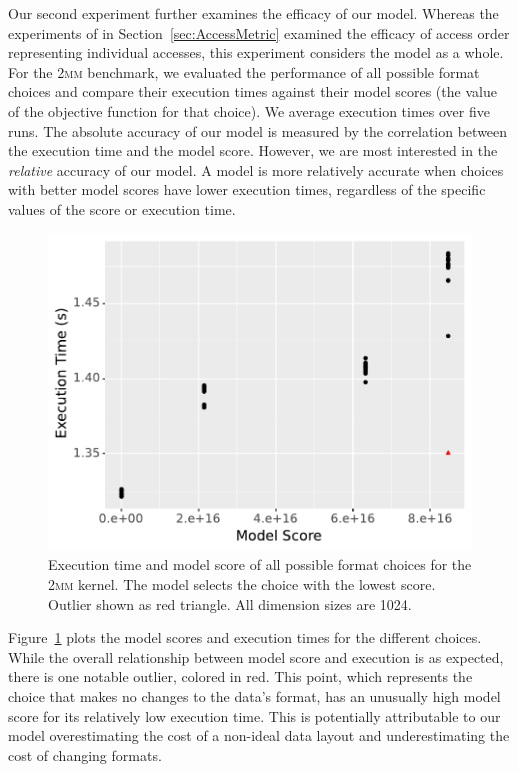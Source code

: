 \documentclass[sigconf,review=true]{acmart}
\begin{document}
Our second experiment further examines the efficacy of our model. 
Whereas the experiments of in Section~\ref{sec:AccessMetric} examined the efficacy of access order representing individual accesses, this experiment considers the model as a whole.
For the \textsc{2mm} benchmark, we evaluated the performance of all possible format choices and compare their execution times against their model scores (the value of the objective function for that choice).
We average execution times over five runs.
The absolute accuracy of our model is measured by the correlation between the execution time and the model score.
However, we are most interested in the \textit{relative} accuracy of our model.
A model is more relatively accurate when choices with better model scores have lower execution times, regardless of the specific values of the score or execution time.

\begin{figure}
	\includegraphics[width=\columnwidth]{2mm-all.pdf}
	\caption{Execution time and model score of all possible format choices for the \textsc{2mm} kernel. The model selects the choice with the lowest score. Outlier shown as red triangle. All dimension sizes are 1024.}
	\label{2MMAllChoices}
\end{figure}


Figure~\ref{2MMAllChoices} plots the model scores and execution times for the different choices. 
While the overall relationship between model score and execution is as expected, there is one notable outlier, colored in red.
This point, which represents the choice that makes no changes to the data's format, has an unusually high model score for its relatively low execution time. 
This is potentially attributable to our model overestimating the cost of a non-ideal data layout and underestimating the cost of changing formats. 
\end{document}
